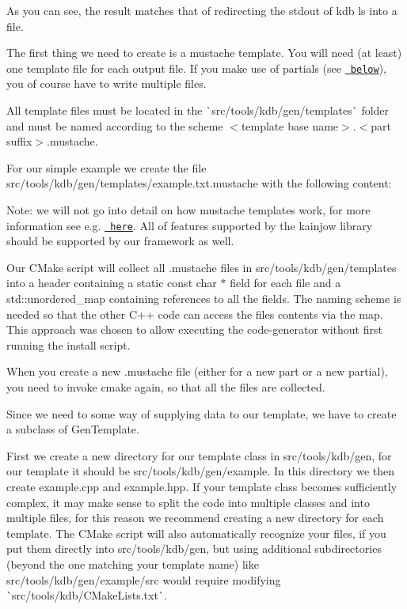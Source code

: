 As you can see, the result matches that of redirecting the stdout of {\ttfamily kdb ls} into a file.

The first thing we need to create is a mustache template. You will need (at least) one template file for each output file. If you make use of partials (see \href{\#using-partials}{\texttt{ below}}), you of course have to write multiple files.

All template files must be located in the \`{}src/tools/kdb/gen/templates\`{} folder and must be named according to the scheme {\ttfamily $<$template base name$>$.$<$part suffix$>$.mustache}.

For our simple example we create the file {\ttfamily src/tools/kdb/gen/templates/example.\+txt.\+mustache} with the following content\+:


\begin{DoxyCode}{0}
\end{DoxyCode}


Note\+: we will not go into detail on how mustache templates work, for more information see e.\+g. \href{https://mustache.github.io/mustache.5.html}{\texttt{ here}}. All of features supported by the kainjow library should be supported by our framework as well.

Our C\+Make script will collect all {\ttfamily .mustache} files in {\ttfamily src/tools/kdb/gen/templates} into a header containing a {\ttfamily static const char $\ast$} field for each file and a {\ttfamily std\+::unordered\+\_\+map} containing references to all the fields. The naming scheme is needed so that the other C++ code can access the files contents via the map. This approach was chosen to allow executing the code-\/generator without first running the install script.

When you create a new {\ttfamily .mustache} file (either for a new part or a new partial), you need to invoke {\ttfamily cmake} again, so that all the files are collected.

Since we need to some way of supplying data to our template, we have to create a subclass of {\ttfamily Gen\+Template}.

First we create a new directory for our template class in {\ttfamily src/tools/kdb/gen}, for our template it should be {\ttfamily src/tools/kdb/gen/example}. In this directory we then create {\ttfamily example.\+cpp} and {\ttfamily example.\+hpp}. If your template class becomes sufficiently complex, it may make sense to split the code into multiple classes and into multiple files, for this reason we recommend creating a new directory for each template. The C\+Make script will also automatically recognize your files, if you put them directly into {\ttfamily src/tools/kdb/gen}, but using additional subdirectories (beyond the one matching your template name) like {\ttfamily src/tools/kdb/gen/example/src} would require modifying \`{}src/tools/kdb/\+C\+Make\+Lists.txt\`{}.

